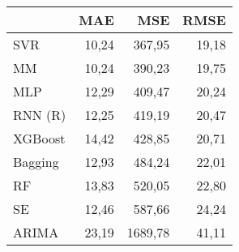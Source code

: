 \begin{tabular}{lrrr}
\toprule
 & MAE & MSE & RMSE \\
\midrule
SVR & 10,24 & 367,95 & 19,18 \\
MM & 10,24 & 390,23 & 19,75 \\
MLP & 12,29 & 409,47 & 20,24 \\
RNN (R) & 12,25 & 419,19 & 20,47 \\
XGBoost & 14,42 & 428,85 & 20,71 \\
Bagging & 12,93 & 484,24 & 22,01 \\
RF & 13,83 & 520,05 & 22,80 \\
SE & 12,46 & 587,66 & 24,24 \\
ARIMA & 23,19 & 1689,78 & 41,11 \\
\bottomrule
\end{tabular}
